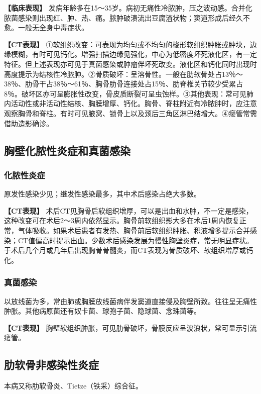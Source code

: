\textbf{【临床表现】}
发病年龄多在15～35岁。病初无痛性冷脓肿，压之波动感。合并化脓菌感染则出现红、肿、热、痛。脓肿破溃流出豆腐渣状物；窦道形成后经久不愈。一般无全身中毒症状。

\textbf{【CT表现】}
①软组织改变：可表现为均匀或不均匀的梭形软组织肿胀或肿块，边缘模糊，有时可见钙化。增强扫描边缘见强化，中心为低密度坏死液化区，有一定特征。但上述表现亦可见于真菌感染或肿瘤伴坏死改变。液化区和钙化同时出现时高度提示为结核性冷脓肿。②骨质破坏：呈溶骨性。一般在肋软骨处占13％～38％、肋骨干占38％～61％、胸骨肋骨连接处占15％、肋脊椎关节较少受累占8％。破坏区亦可呈膨胀性改变，骨皮质断裂可呈虫蚀样。③其他表现：常可见肺内活动性或非活动性结核、胸膜增厚、钙化。胸骨、脊柱附近有冷脓肿时，应注意观察胸骨和脊柱。有时可见腋窝、锁骨上以及颈后三角区淋巴结增大。④瘘管常需借助造影确诊。

\subsection{胸壁化脓性炎症和真菌感染}

\subsubsection{化脓性炎症}

原发性感染少见；继发性感染最多，其中术后感染占绝大多数。

\textbf{【CT表现】}
术后CT见胸骨后软组织增厚，可以是出血和水肿，不一定是感染，这种改变可在术后2～3周内依然显示。胸骨前软组织影大多在术后1周内恢复正常，气体吸收。如果术后患者有发热、胸骨前后软组织肿胀、积液增多提示合并感染；CT值偏高时提示出血。少数术后感染发展为慢性胸壁炎症，常无明显症状。于术后几个月或几年后出现胸骨骨髓炎，而CT表现为骨质破坏、软组织增厚或钙化。

\subsubsection{真菌感染}

以放线菌为多，常由肺或胸膜放线菌病伴发窦道直接侵及胸壁所致。往往呈无痛性肿胀。其他病原菌还有奴卡菌、球孢子菌、隐球菌、念珠菌等。

\textbf{【CT表现】}
胸壁软组织肿胀，可见肋骨破坏，骨膜反应呈波浪状，常可显示引流瘘管。

\subsection{肋软骨非感染性炎症}

本病又称肋软骨炎、Tietze（铁采）综合征。

